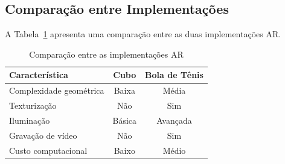 \subsection{Comparação entre Implementações}

A Tabela~\ref{tab:comparacao} apresenta uma comparação entre as duas implementações AR.

\begin{table}[H]
    \centering
    \begin{tabular}{lcc}
        \toprule
        \textbf{Característica} & \textbf{Cubo} & \textbf{Bola de Tênis} \\
        \midrule
        Complexidade geométrica & Baixa & Média \\
        Texturização & Não & Sim \\
        Iluminação & Básica & Avançada \\
        Gravação de vídeo & Não & Sim \\
        Custo computacional & Baixo & Médio \\
        \bottomrule
    \end{tabular}
    \caption{Comparação entre as implementações AR}
    \label{tab:comparacao}
\end{table}
